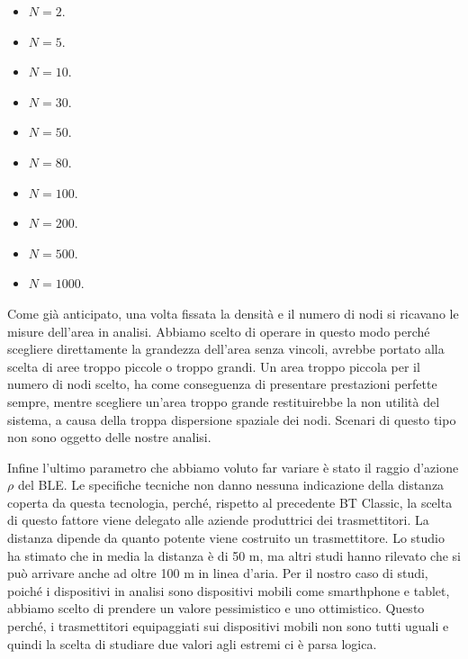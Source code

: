 \begin{itemize}
	\item $ N = 2 $.
	\item $ N = 5 $.
	\item $ N = 10 $.
	\item $ N = 30 $.
	\item $ N = 50 $.
	\item $ N = 80 $.
	\item $ N = 100 $.
	\item $ N = 200 $.
	\item $ N = 500 $.
	\item $ N = 1000 $.
\end{itemize}
Come già anticipato, una volta fissata la densità e il numero di nodi si ricavano le misure dell'area in analisi. Abbiamo scelto di operare in questo modo perché scegliere direttamente la grandezza dell'area senza vincoli, avrebbe portato alla scelta di aree troppo piccole o troppo grandi. Un area troppo piccola per il numero di nodi scelto, ha come conseguenza di presentare prestazioni perfette sempre, mentre scegliere un'area troppo grande restituirebbe la non utilità del sistema, a causa della troppa dispersione spaziale dei nodi. Scenari di questo tipo non sono oggetto delle nostre analisi.

Infine l'ultimo parametro che abbiamo voluto far variare è stato il raggio d'azione $\rho$ del \acs{BLE}. Le specifiche tecniche non danno nessuna indicazione della distanza coperta da questa tecnologia, perché, rispetto al precedente BT Classic, la scelta di questo fattore viene delegato alle aziende produttrici dei trasmettitori. La distanza dipende da quanto potente viene costruito un trasmettitore.
Lo studio \cite{tesi_tibertoa2013} ha stimato che in media la distanza è di 50 m, ma altri studi hanno rilevato che si può arrivare anche ad oltre 100 m in linea d'aria. Per il nostro caso di studi, poiché i dispositivi in analisi sono dispositivi mobili come smarthphone e tablet, abbiamo scelto di prendere un valore pessimistico e uno ottimistico. Questo perché, i trasmettitori equipaggiati sui dispositivi mobili non sono tutti uguali e quindi la scelta di studiare due valori agli estremi ci è parsa logica.
\medskip


